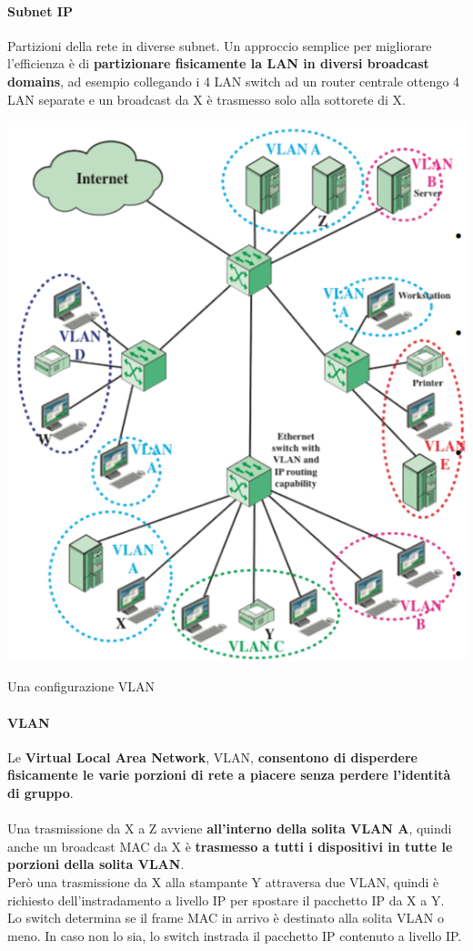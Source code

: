 \documentclass[10pt]{article}
\begin{document}
\paragraph{Subnet IP} Partizioni della rete in diverse subnet. Un approccio semplice per migliorare l'efficienza è di \textbf{partizionare fisicamente la LAN in diversi broadcast domains}, ad esempio collegando i 4 LAN switch ad un router centrale ottengo 4 LAN separate e un broadcast da X è trasmesso solo alla sottorete di X.
\pagebreak
\begin{multicols}{2}
\begin{center}
	\includegraphics[scale=0.6]{vlan.png}
\end{center}
Una configurazione VLAN
\columnbreak
\paragraph{VLAN} Le \textbf{Virtual Local Area Network}, VLAN, \textbf{consentono di disperdere fisicamente le varie porzioni di rete a piacere senza perdere l'identità di gruppo}.\\\\
Una trasmissione da X a Z avviene \textbf{all'interno della solita VLAN A}, quindi anche un broadcast MAC da X è \textbf{trasmesso a tutti i dispositivi in tutte le porzioni della solita VLAN}.\\
Però una trasmissione da X alla stampante Y attraversa due VLAN, quindi è richiesto dell'instradamento a livello IP per spostare il pacchetto IP da X a Y.\\
Lo switch determina se il frame MAC in arrivo è destinato alla solita VLAN o meno. In caso non lo sia, lo switch instrada il pacchetto IP contenuto a livello IP.
\end{multicols}
\end{document}

